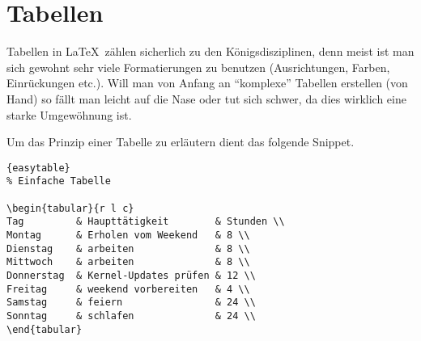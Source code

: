\section{Tabellen}

\indent
Tabellen in \LaTeX~zählen sicherlich zu den
Königsdisziplinen, denn meist ist man sich gewohnt sehr
viele Formatierungen zu benutzen (Ausrichtungen, Farben,
Einrückungen etc.). Will man von Anfang an ``komplexe''
Tabellen erstellen (von Hand) so fällt man leicht auf die
Nase oder tut sich schwer, da dies wirklich eine starke
Umgewöhnung ist.

Um das Prinzip einer Tabelle zu erläutern dient das
folgende Snippet.

\begin{center}
\begin{lstlisting}[caption=Einfache Tabelle]{easytable}
% Einfache Tabelle

\begin{tabular}{r l c}
Tag         & Haupttätigkeit        & Stunden \\
Montag      & Erholen vom Weekend   & 8 \\
Dienstag    & arbeiten              & 8 \\
Mittwoch    & arbeiten              & 8 \\
Donnerstag  & Kernel-Updates prüfen & 12 \\
Freitag     & weekend vorbereiten   & 4 \\
Samstag     & feiern                & 24 \\
Sonntag     & schlafen              & 24 \\
\end{tabular}
\end{lstlisting}
\end{center}


